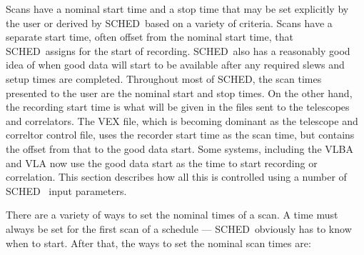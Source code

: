 \documentclass{report}
\newcommand{\sched}{{\sc SCHED}}
\newcommand{\schedb}{{\sc SCHED~}}
\begin{document}
Scans have a nominal start time and a stop time that may be set
explicitly by the user or derived by \schedb based on a variety of
criteria.  Scans have a separate start time, often offset from the
nominal start time, that \schedb assigns for the start of recording.
\schedb also has a reasonably good idea of when good data will start
to be available after any required slews and setup times are
completed.  Throughout most of \sched, the scan times presented to the
user are the nominal start and stop times.  On the other hand, the
recording start time is what will be given in the files sent to the
telescopes and correlators.  The VEX file, which is becoming dominant
as the telescope and correltor control file, uses the recorder start
time as the scan time, but contains the offset from that to the good
data start.  Some systems, including the VLBA and VLA now use the good
data start as the time to start recording or correlation.  This
section describes how all this is controlled using a number of \schedb
input parameters.

There are a variety of ways to set the nominal times of a scan.  A
 time must always be set for the first
scan of a schedule --- \schedb obviously has to know when to start.
After that, the ways to set the nominal scan times are:
\end{document}
